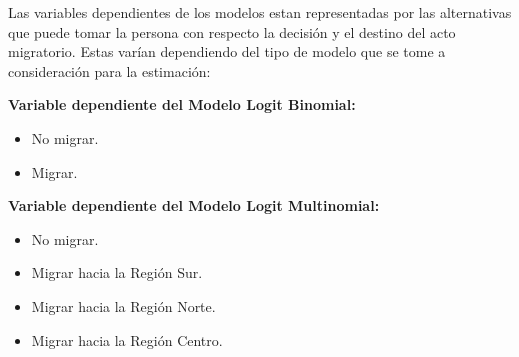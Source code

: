 \documentclass[12pt,a4paper]{article}
\begin{document}
Las variables dependientes de los modelos estan representadas por las alternativas que puede tomar la persona con respecto la decisión y el destino del acto migratorio. Estas varían dependiendo del tipo de modelo que se tome a consideración para la estimación:

\textbf{Variable dependiente del Modelo Logit Binomial:}
\begin{itemize}
\item No migrar.
\item Migrar.
\end{itemize}

\textbf{Variable dependiente del Modelo Logit Multinomial:}
\begin{itemize}
\item No migrar.
\item Migrar hacia la Región Sur.
\item Migrar hacia la Región Norte.
\item Migrar hacia la Región Centro.
\end{itemize}
\end{document}
